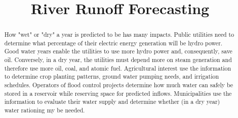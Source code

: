 \documentclass[conference]{IEEEtran}
\begin{document}
%
\title{River Runoff Forecasting}


\author{
}

\maketitle


\begin{abstract}
How "wet" or "dry" a year is predicted to be has many impacts. Public utilities
need to determine what percentage of their electric energy generation will be
hydro power. Good water years enable the utilities to use more hydro power
and, consequently, save oil. Conversely, in a dry year, the utilities must depend
more on steam generation and therefore use more oil, coal, and atomic fuel.
Agricultural interest use the information to determine crop planting patterns,
ground water pumping needs, and irrigation schedules. Operators of flood
control projects determine how much water can safely be stored in a reservoir
while reserving space for predicted inflows. Municipalities use the information to
evaluate their water supply and determine whether (in a dry year) water rationing
my be needed.

\end{abstract}





%
\IEEEpeerreviewmaketitle
\end{document}
